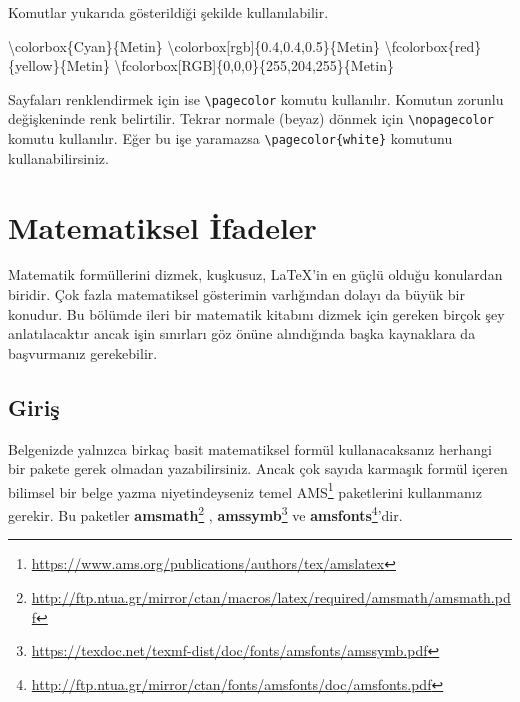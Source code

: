 \documentclass[
  10pt,
]{scrbook}
\newenvironment{Shaded}{\begin{snugshade}}{\end{snugshade}}
\newcommand{\FunctionTok}[1]{\textcolor[rgb]{0.00,0.00,0.00}{#1}}
\newcommand{\NormalTok}[1]{#1}
\renewcommand{\href}[2]{#2\footnote{\url{#1}}}
\theoremstyle{definition}
\theoremstyle{definition}
\theoremstyle{definition}
\theoremstyle{definition}
\theoremstyle{remark}
\begin{document}
Komutlar yukarıda gösterildiği şekilde kullanılabilir.

\begin{Shaded}
\begin{Highlighting}[]
\FunctionTok{\textbackslash{}colorbox}\NormalTok{\{Cyan\}\{Metin\}}
\FunctionTok{\textbackslash{}colorbox}\NormalTok{[rgb]\{0.4,0.4,0.5\}\{Metin\}}
\FunctionTok{\textbackslash{}fcolorbox}\NormalTok{\{red\}\{yellow\}\{Metin\}}
\FunctionTok{\textbackslash{}fcolorbox}\NormalTok{[RGB]\{0,0,0\}\{255,204,255\}\{Metin\}}
\end{Highlighting}
\end{Shaded}

Sayfaları renklendirmek için ise \texttt{\textbackslash{}pagecolor} komutu kullanılır. Komutun zorunlu değişkeninde renk belirtilir. Tekrar normale (beyaz) dönmek için \texttt{\textbackslash{}nopagecolor} komutu kullanılır. Eğer bu işe yaramazsa \texttt{\textbackslash{}pagecolor\{white\}} komutunu kullanabilirsiniz.

\hypertarget{matematiksel-ifadeler}{%
\chapter{Matematiksel İfadeler}\label{matematiksel-ifadeler}}

Matematik formüllerini dizmek, kuşkusuz, LaTeX'in en güçlü olduğu konulardan biridir. Çok fazla matematiksel gösterimin varlığından dolayı da büyük bir konudur. Bu bölümde ileri bir matematik kitabını dizmek için gereken birçok şey anlatılacaktır ancak işin sınırları göz önüne alındığında başka kaynaklara da başvurmanız gerekebilir.

\hypertarget{giriux15f-1}{%
\section{Giriş}\label{giriux15f-1}}

Belgenizde yalnızca birkaç basit matematiksel formül kullanacaksanız herhangi bir pakete gerek olmadan yazabilirsiniz. Ancak çok sayıda karmaşık formül içeren bilimsel bir belge yazma niyetindeyseniz temel \href{https://www.ams.org/publications/authors/tex/amslatex}{AMS} paketlerini kullanmanız gerekir. Bu paketler \href{http://ftp.ntua.gr/mirror/ctan/macros/latex/required/amsmath/amsmath.pdf}{\textbf{amsmath}} , \href{https://texdoc.net/texmf-dist/doc/fonts/amsfonts/amssymb.pdf}{\textbf{amssymb}} ve \href{http://ftp.ntua.gr/mirror/ctan/fonts/amsfonts/doc/amsfonts.pdf}{\textbf{amsfonts}}'dir.
\end{document}
